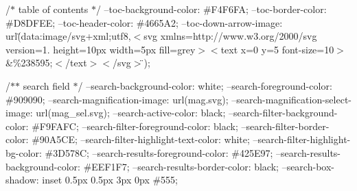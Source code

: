 /\texorpdfstring{$\ast$}{*} table of contents \texorpdfstring{$\ast$}{*}/ --toc-\/background-\/color\+: \#\+F4\+F6\+FA; --toc-\/border-\/color\+: \#\+D8\+DFEE; --toc-\/header-\/color\+: \#4665A2; --toc-\/down-\/arrow-\/image\+: url(\"{}data\+:image/svg+xml;utf8,$<$svg xmlns=\textquotesingle{}http\+://www.\+w3.\+org/2000/svg\textquotesingle{} version=\textquotesingle{}1.\textquotesingle{} height=\textquotesingle{}10px\textquotesingle{} width=\textquotesingle{}5px\textquotesingle{} fill=\textquotesingle{}grey\textquotesingle{}$>$$<$text x=\textquotesingle{}0\textquotesingle{} y=\textquotesingle{}5\textquotesingle{} font-\/size=\textquotesingle{}10\textquotesingle{}$>$\&\%238595;$<$/text$>$$<$/svg$>$\"{});

/\texorpdfstring{$\ast$}{*}\texorpdfstring{$\ast$}{*} search field \texorpdfstring{$\ast$}{*}/ --search-\/background-\/color\+: white; --search-\/foreground-\/color\+: \#909090; --search-\/magnification-\/image\+: url(\textquotesingle{}mag.\+svg\textquotesingle{}); --search-\/magnification-\/select-\/image\+: url(\textquotesingle{}mag\+\_\+sel.\+svg\textquotesingle{}); --search-\/active-\/color\+: black; --search-\/filter-\/background-\/color\+: \#\+F9\+FAFC; --search-\/filter-\/foreground-\/color\+: black; --search-\/filter-\/border-\/color\+: \#90A5\+CE; --search-\/filter-\/highlight-\/text-\/color\+: white; --search-\/filter-\/highlight-\/bg-\/color\+: \#3D578C; --search-\/results-\/foreground-\/color\+: \#425E97; --search-\/results-\/background-\/color\+: \#\+EEF1\+F7; --search-\/results-\/border-\/color\+: black; --search-\/box-\/shadow\+: inset 0.\+5px 0.\+5px 3px 0px \#555;

